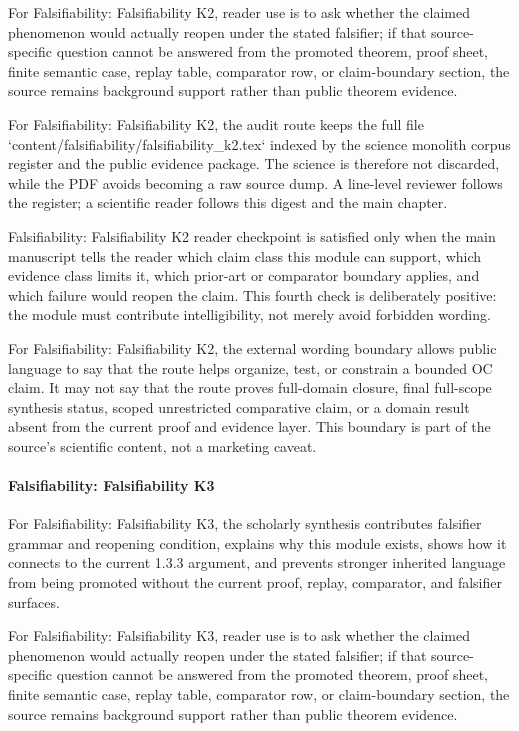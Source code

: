 For Falsifiability: Falsifiability K2, reader use is to ask whether the claimed phenomenon would actually reopen under the stated falsifier; if that source-specific question cannot be answered from the promoted theorem, proof sheet, finite semantic case, replay table, comparator row, or claim-boundary section, the source remains background support rather than public theorem evidence.


For Falsifiability: Falsifiability K2, the audit route keeps the full file `content/falsifiability/falsifiability\_k2.tex` indexed by the science monolith corpus register and the public evidence package. The science is therefore not discarded, while the PDF avoids becoming a raw source dump. A line-level reviewer follows the register; a scientific reader follows this digest and the main chapter.


Falsifiability: Falsifiability K2 reader checkpoint is satisfied only when the main manuscript tells the reader which claim class this module can support, which evidence class limits it, which prior-art or comparator boundary applies, and which failure would reopen the claim. This fourth check is deliberately positive: the module must contribute intelligibility, not merely avoid forbidden wording.


For Falsifiability: Falsifiability K2, the external wording boundary allows public language to say that the route helps organize, test, or constrain a bounded OC claim. It may not say that the route proves full-domain closure, final full-scope synthesis status, scoped unrestricted comparative claim, or a domain result absent from the current proof and evidence layer. This boundary is part of the source's scientific content, not a marketing caveat.


\paragraph{Falsifiability: Falsifiability K3}

For Falsifiability: Falsifiability K3, the scholarly synthesis contributes falsifier grammar and reopening condition, explains why this module exists, shows how it connects to the current 1.3.3 argument, and prevents stronger inherited language from being promoted without the current proof, replay, comparator, and falsifier surfaces.


For Falsifiability: Falsifiability K3, reader use is to ask whether the claimed phenomenon would actually reopen under the stated falsifier; if that source-specific question cannot be answered from the promoted theorem, proof sheet, finite semantic case, replay table, comparator row, or claim-boundary section, the source remains background support rather than public theorem evidence.


